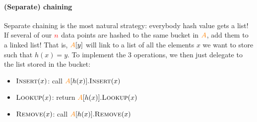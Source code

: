 \paragraph{(Separate) chaining}
Separate chaining is the most natural strategy: everybody hash value gets a list! If several of our ${\textcolor{red}{n}}$ data points are hashed to the same bucket in $\textcolor{orange}{A}$, add them to a linked list! That is, $\textcolor{orange}{A}[y]$ will link to a list of all the elements $x$ we want to store such that $h(x)=y$. To implement the 3 operations, we then just delegate to the list stored in the bucket:
    \begin{itemize}
        \item$\textsc{Insert}(x)$: call $\textcolor{orange}{A}[h(x)].\textsc{Insert}(x)$
        \item$\textsc{Lookup}(x)$: return $\textcolor{orange}{A}[h(x)].\textsc{Lookup}(x)$
        \item$\textsc{Remove}(x)$: call $\textcolor{orange}{A}[h(x)].\textsc{Remove}(x)$
    \end{itemize}
